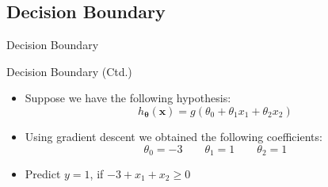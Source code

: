 \subsection{Decision Boundary}

\begin{frame}{Decision Boundary}{}
\end{frame}


\begin{frame}{Decision Boundary (Ctd.)}{}
	\begin{itemize}
		\item Suppose we have the following hypothesis:
		\begin{equation*}
			h_{\bm{\theta}}(\bm{x}) = g(\theta_0 + \theta_1 x_1 + \theta_2 x_2)
		\end{equation*}
		\item Using gradient descent we obtained the following coefficients:
		\begin{equation*}
			\theta_0 = -3 \qquad \theta_1 = 1 \qquad \theta_2 = 1
		\end{equation*}
		\item Predict $y = 1$, if $-3 + x_1 + x_2 \ge 0$
	\end{itemize}
\end{frame}


